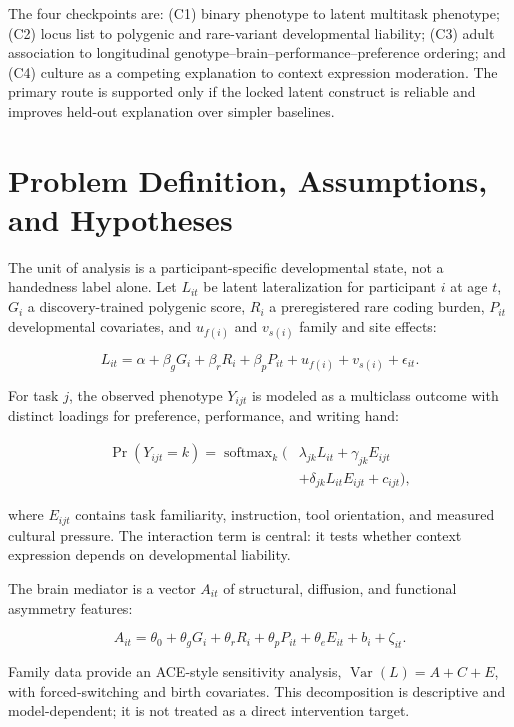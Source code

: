 \documentclass[10pt,conference]{IEEEtran}
\begin{document}
The four checkpoints are: (C1) binary phenotype to latent multitask phenotype; (C2) locus list to polygenic and rare-variant developmental liability; (C3) adult association to longitudinal genotype--brain--performance--preference ordering; and (C4) culture as a competing explanation to context expression moderation. The primary route is supported only if the locked latent construct is reliable and improves held-out explanation over simpler baselines.

\section{Problem Definition, Assumptions, and Hypotheses}
The unit of analysis is a participant-specific developmental state, not a handedness label alone. Let $L_{it}$ be latent lateralization for participant $i$ at age $t$, $G_i$ a discovery-trained polygenic score, $R_i$ a preregistered rare coding burden, $P_{it}$ developmental covariates, and $u_{f(i)}$ and $v_{s(i)}$ family and site effects:

\begin{equation}
L_{it}=\alpha+\beta_gG_i+\beta_rR_i+\beta_pP_{it}+u_{f(i)}+v_{s(i)}+\epsilon_{it}.
\end{equation}

For task $j$, the observed phenotype $Y_{ijt}$ is modeled as a multiclass outcome with distinct loadings for preference, performance, and writing hand:

\begin{equation}
\begin{aligned}
\Pr(Y_{ijt}=k)=\operatorname{softmax}_k(&\lambda_{jk}L_{it}+\gamma_{jk}E_{ijt}\\
&+\delta_{jk}L_{it}E_{ijt}+c_{ijt}),
\end{aligned}
\end{equation}

where $E_{ijt}$ contains task familiarity, instruction, tool orientation, and measured cultural pressure. The interaction term is central: it tests whether context expression depends on developmental liability.

The brain mediator is a vector $A_{it}$ of structural, diffusion, and functional asymmetry features:

\begin{equation}
A_{it}=\theta_0+\theta_gG_i+\theta_rR_i+\theta_pP_{it}+\theta_eE_{it}+b_i+\zeta_{it}.
\end{equation}

Family data provide an ACE-style sensitivity analysis, $\operatorname{Var}(L)=A+C+E$, with forced-switching and birth covariates. This decomposition is descriptive and model-dependent; it is not treated as a direct intervention target.
\end{document}
